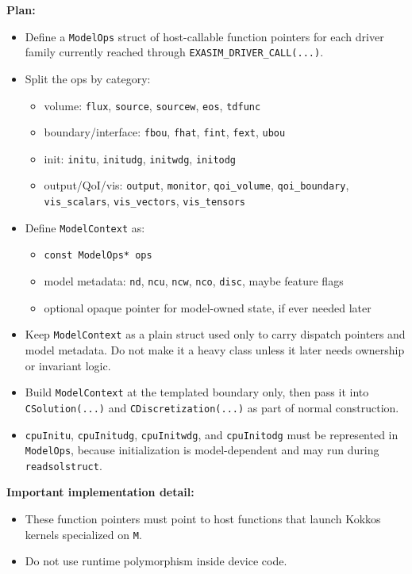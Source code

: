 \documentclass[11pt]{article}
\begin{document}
\textbf{Plan:}
\begin{itemize}[leftmargin=*]
\item Define a \texttt{ModelOps} struct of host-callable function pointers for each driver family currently reached through \texttt{EXASIM\_DRIVER\_CALL(...)}.
\item Split the ops by category:
\begin{itemize}[leftmargin=*]
\item volume: \texttt{flux}, \texttt{source}, \texttt{sourcew}, \texttt{eos}, \texttt{tdfunc}
\item boundary/interface: \texttt{fbou}, \texttt{fhat}, \texttt{fint}, \texttt{fext}, \texttt{ubou}
\item init: \texttt{initu}, \texttt{initudg}, \texttt{initwdg}, \texttt{initodg}
\item output/QoI/vis: \texttt{output}, \texttt{monitor}, \texttt{qoi\_volume}, \texttt{qoi\_boundary}, \texttt{vis\_scalars}, \texttt{vis\_vectors}, \texttt{vis\_tensors}
\end{itemize}
\item Define \texttt{ModelContext} as:
\begin{itemize}[leftmargin=*]
\item \texttt{const ModelOps* ops}
\item model metadata: \texttt{nd}, \texttt{ncu}, \texttt{ncw}, \texttt{nco}, \texttt{disc}, maybe feature flags
\item optional opaque pointer for model-owned state, if ever needed later
\end{itemize}
\item Keep \texttt{ModelContext} as a plain struct used only to carry dispatch pointers and model metadata. Do not make it a heavy class unless it later needs ownership or invariant logic.
\item Build \texttt{ModelContext} at the templated boundary only, then pass it into \texttt{CSolution(...)} and \texttt{CDiscretization(...)} as part of normal construction.
\item \texttt{cpuInitu}, \texttt{cpuInitudg}, \texttt{cpuInitwdg}, and \texttt{cpuInitodg} must be represented in \texttt{ModelOps}, because initialization is model-dependent and may run during \texttt{readsolstruct}.
\end{itemize}

\textbf{Important implementation detail:}
\begin{itemize}[leftmargin=*]
\item These function pointers must point to host functions that launch Kokkos kernels specialized on \texttt{M}.
\item Do not use runtime polymorphism inside device code.
\end{itemize}
\end{document}

